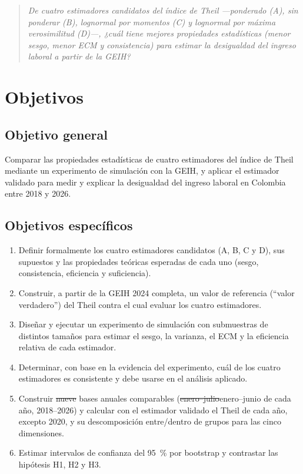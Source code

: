 \documentclass[12pt,letterpaper]{article}
\providecommand{\DIFaddtex}[1]{{\protect\color{BLUE}#1}} %
\providecommand{\DIFdeltex}[1]{{\protect\color{RED}\sout{#1}}} %
\providecommand{\DIFaddtex}[1]{\texorpdfstring{\DIFaddtex{#1}}{#1}} %
\providecommand{\DIFdeltex}[1]{\texorpdfstring{\DIFdeltex{#1}}{}} %
\providecommand{\DIFaddbegin}{}\providecommand{\DIFaddend}{} %
\providecommand{\DIFdelbegin}{}\providecommand{\DIFdelend}{} %
\providecommand{\DIFadd}[1]{\texorpdfstring{\DIFaddtex{#1}}{#1}} %
\providecommand{\DIFdel}[1]{\texorpdfstring{\DIFdeltex{#1}}{}} %
\begin{document}
\begin{quote}
\emph{De cuatro estimadores candidatos del índice de Theil ---ponderado (A), sin ponderar (B), lognormal por momentos (C) y lognormal por máxima verosimilitud (D)---, ¿cuál tiene mejores propiedades estadísticas (menor sesgo, menor ECM y consistencia) para estimar la desigualdad del ingreso laboral a partir de la GEIH?}
\end{quote}


\section{Objetivos}

\subsection{Objetivo general}

Comparar las propiedades estadísticas de cuatro estimadores del índice de Theil mediante un experimento de simulación con la GEIH, y aplicar el estimador validado para medir y explicar la desigualdad del ingreso laboral en Colombia entre 2018 y 2026.

\subsection{Objetivos específicos}

\begin{enumerate}[leftmargin=0.75in]
  \item Definir formalmente los cuatro estimadores candidatos (A, B, C y D), sus supuestos y las propiedades teóricas esperadas de cada uno (sesgo, consistencia, eficiencia y suficiencia).
  \item Construir, a partir de la GEIH 2024 completa, un valor de referencia (``valor verdadero'') del Theil contra el cual evaluar los cuatro estimadores.
  \item Diseñar y ejecutar un experimento de simulación con submuestras de distintos tamaños para estimar el sesgo, la varianza, el ECM y la eficiencia relativa de cada estimador.
  \item Determinar, con base en la evidencia del experimento, cuál de los cuatro estimadores es consistente y debe usarse en el análisis aplicado.
  \item Construir \DIFdelbegin \DIFdel{nueve }\DIFdelend bases anuales comparables (\DIFdelbegin \DIFdel{enero--julio}\DIFdelend \DIFaddbegin \DIFadd{enero--junio de cada año}\DIFaddend , 2018--2026) y calcular con el estimador validado el Theil de cada año\DIFaddbegin \DIFadd{, excepto 2020, }\DIFaddend y su descomposición entre/dentro de grupos para las cinco dimensiones.
  \item Estimar intervalos de confianza del 95~\% por bootstrap y contrastar las hipótesis H1, H2 y H3.
\end{enumerate}
\end{document}
